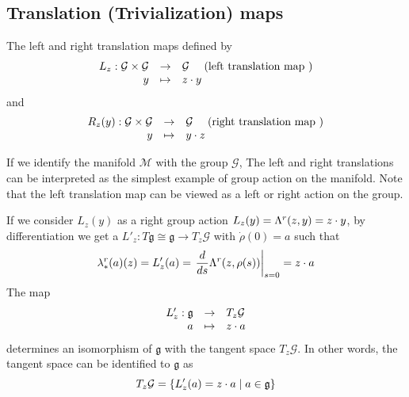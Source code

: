 \subsection{Translation (Trivialization) maps}
The left and right translation maps defined by 
\begin{equation}
  \label{eq:148}
  \begin{array}{rcl}
    L_z  : \mathcal G \times \mathcal G &\rightarrow& \mathcal G \quad \text{ (left translation map )} \\
    y &\mapsto&  z \cdot y
  \end{array}
\end{equation}
and 
\begin{equation}
  \label{eq:149}
  \begin{array}{rcl}
    R_z(y)  :  \mathcal G \times  \mathcal G  & \rightarrow& \mathcal G \quad \text{ (right translation map )} \\
    y  &\mapsto&  y \cdot z 
  \end{array}
\end{equation}

If we identify the manifold $\mathcal M$ with the group $\mathcal G$, The left and right translations can be interpreted as the simplest example of group action on the manifold. Note that the left translation map can be viewed as a left or right action on the group.

If we consider $L_z(y)$ as a right group action $ L_z(y) = \Lambda^r( z, y) =z \cdot y $, by differentiation we get a $L'_z : T \mathfrak g \cong  \mathfrak g \rightarrow T_z\mathcal G$ with $\dot\rho (0)=a$ such that
\begin{equation}
  \label{eq:150}
  \lambda^r_{*}(a)(z) = L'_z(a) = \left.\frac{d}{ds}{ \Lambda^r (z, \rho(s))}\right|_{s=0} = z \cdot a
\end{equation}
The map
\begin{equation}
  \label{eq:152}
  \begin{array}{rcl}
  L'_z  : \mathfrak g &\rightarrow& T_z\mathcal G  \\
         a &\mapsto&  z \cdot a
  \end{array}
\end{equation}
determines an isomorphism of $\mathfrak g$ with the tangent space  $T_z\mathcal G$. In other words, the  tangent space can be identified to $\mathfrak g$ as
\begin{equation}
  \label{eq:153}
  T_z\mathcal G =\{L'_z(a) = z \cdot a \mid a \in \mathfrak g  \}
\end{equation}

